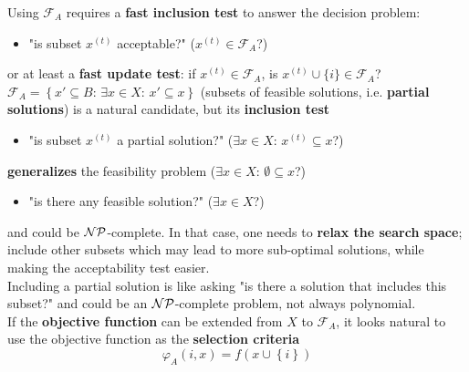 Using $\mathcal{F}_A$ requires a \textbf{fast inclusion test} to answer the decision problem:
\begin{itemize}[label*=]
	\item "is subset $x^{(t)}$ acceptable?" ($x^{(t)} \in \mathcal{F}_A$?)
\end{itemize}
or at least a \textbf{fast update test}: if $x^{(t)} \in \mathcal{F}_A$, is $x^{(t)} \cup \{i\} \in \mathcal{F}_A$? \\

$\mathcal{F}_A = \left\{x' \subseteq B : \, \exists x \in X : \, x' \subseteq x\right\}$ (subsets of feasible solutions, i.e. \textbf{partial solutions}) is a natural candidate, but its \textbf{inclusion test}
\begin{itemize}[label*=]
	\item "is subset $x^{(t)}$ a partial solution?" ($\exists x \in X : \, x^{(t)} \subseteq x$?)
\end{itemize}
\textbf{generalizes} the feasibility problem ($\exists x \in X : \, \emptyset \subseteq x$?)
\begin{itemize}[label*=]
	\item "is there any feasible solution?" ($\exists x \in X$?)
\end{itemize}
and could be $\mathcal{NP}$-complete. In that case, one needs to \textbf{relax the search space}; include other subsets which may lead to more sub-optimal solutions, while making the acceptability test easier.\\

Including a partial solution is like asking "is there a solution that includes this subset?" and could be an $\mathcal{NP}$-complete problem, not always polynomial.\\

If the \textbf{objective function} can be extended from $X$ to $\mathcal{F}_A$, it looks natural to use the objective function as the \textbf{selection criteria}
$$ \varphi_A (i,x) = f \left(x \cup \left\{i\right\} \right)$$

\newpage

